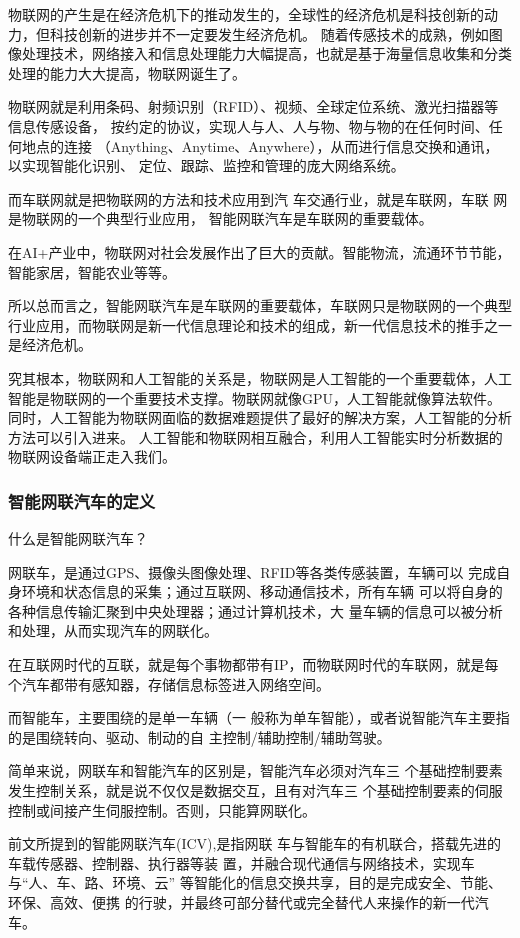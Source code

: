 \documentclass[12pt,a4paper,oneside]{article}
\begin{document}
物联网的产生是在经济危机下的推动发生的，全球性的经济危机是科技创新的动力，但科技创新的进步并不一定要发生经济危机。
随着传感技术的成熟，例如图像处理技术，网络接入和信息处理能力大幅提高，也就是基于海量信息收集和分类处理的能力大大提高，物联网诞生了。

物联网就是利用条码、射频识别（RFID）、视频、全球定位系统、激光扫描器等信息传感设备，
按约定的协议，实现人与人、人与物、物与物的在任何时间、任何地点的连接
（Anything、Anytime、Anywhere），从而进行信息交换和通讯，以实现智能化识别、
定位、跟踪、监控和管理的庞大网络系统。


而车联网就是把物联网的方法和技术应用到汽
车交通行业，就是车联网，车联
网是物联网的一个典型行业应用，
智能网联汽车是车联网的重要载体。

在AI+产业中，物联网对社会发展作出了巨大的贡献。智能物流，流通环节节能，智能家居，智能农业等等。

所以总而言之，智能网联汽车是车联网的重要载体，车联网只是物联网的一个典型行业应用，而物联网是新一代信息理论和技术的组成，新一代信息技术的推手之一是经济危机。

究其根本，物联网和人工智能的关系是，物联网是人工智能的一个重要载体，人工智能是物联网的一个重要技术支撑。物联网就像GPU，人工智能就像算法软件。
同时，人工智能为物联网面临的数据难题提供了最好的解决方案，人工智能的分析方法可以引入进来。
人工智能和物联网相互融合，利用人工智能实时分析数据的物联网设备端正走入我们。
\subsubsection{智能网联汽车的定义}
什么是智能网联汽车？

网联车，是通过GPS、摄像头图像处理、RFID等各类传感装置，车辆可以
完成自身环境和状态信息的采集；通过互联网、移动通信技术，所有车辆
可以将自身的各种信息传输汇聚到中央处理器；通过计算机技术，大
量车辆的信息可以被分析和处理，从而实现汽车的网联化。

在互联网时代的互联，就是每个事物都带有IP，而物联网时代的车联网，就是每个汽车都带有感知器，存储信息标签进入网络空间。

而智能车，主要围绕的是单一车辆（一
般称为单车智能），或者说智能汽车主要指的是围绕转向、驱动、制动的自
主控制/辅助控制/辅助驾驶。

简单来说，网联车和智能汽车的区别是，智能汽车必须对汽车三
个基础控制要素发生控制关系，就是说不仅仅是数据交互，且有对汽车三
个基础控制要素的伺服控制或间接产生伺服控制。否则，只能算网联化。

前文所提到的智能网联汽车(ICV),是指网联
车与智能车的有机联合，搭载先进的车载传感器、控制器、执行器等装
置，并融合现代通信与网络技术，实现车与“人、车、路、环境、云”
等智能化的信息交换共享，目的是完成安全、节能、环保、高效、便携
的行驶，并最终可部分替代或完全替代人来操作的新一代汽车。
\end{document}
